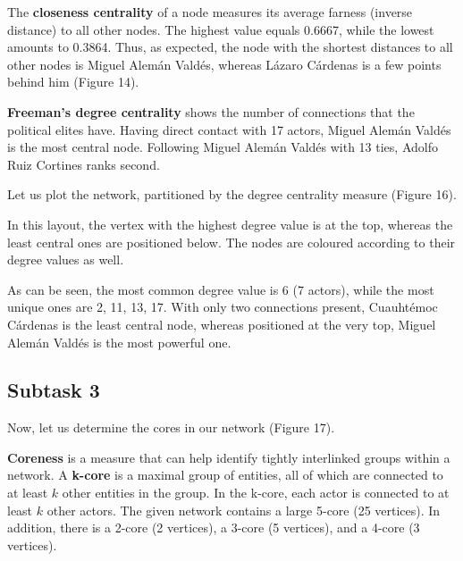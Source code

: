 
The \textbf{closeness centrality} of a node measures its average farness (inverse distance) to all other nodes. The highest value equals 0.6667, while the lowest amounts to 0.3864. Thus, as expected, the node with the shortest distances to all other nodes is Miguel Alemán Valdés, whereas Lázaro Cárdenas is a few points behind him (Figure 14).


\textbf{Freeman’s degree centrality} shows the number of connections that the political elites have. Having direct contact with 17 actors, Miguel Alemán Valdés is the most central node. Following Miguel Alemán Valdés with 13 ties, Adolfo Ruiz Cortines ranks second.

\FloatBarrier


Let us plot the network, partitioned by the degree centrality measure (Figure 16).


In this layout, the vertex with the highest degree value is at the top, whereas the least central ones are positioned below. The nodes are coloured according to their degree values as well.

As can be seen, the most common degree value is 6 (7 actors), while the most unique ones are 2, 11, 13, 17. With only two connections present, Cuauhtémoc Cárdenas is the least central node, whereas positioned at the very top, Miguel Alemán Valdés is the most powerful one.


\FloatBarrier
\clearpage


\subsection{Subtask 3}
Now, let us determine the cores in our network (Figure 17).


\textbf{Coreness} is a measure that can help identify tightly interlinked groups within a network. A \textbf{k-core} is a maximal group of entities, all of which are connected to at least $k$ other entities in the group. In the k-core, each actor is connected to at least $k$ other actors. The given network contains a large 5-core (25 vertices). In addition, there is a 2-core (2 vertices), a 3-core (5 vertices), and a 4-core (3 vertices). 

